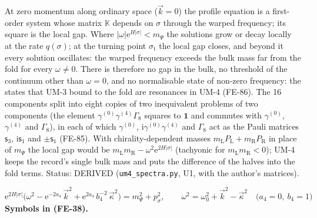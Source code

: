\documentclass[
  10pt,
]{article}
\begin{document}
At zero momentum along ordinary space (\(\vec k = 0\)) the profile
equation is a first-order system whose matrix \(\mathbb{K}\) depends on
\(\sigma\) through the warped frequency; its square is the local gap.
Where \(\lvert\omega\rvert\mathrm{e}^{H\lvert\sigma\rvert} < m_\Psi\)
the solutions grow or decay locally at the rate \(q(\sigma)\); at the
turning point \(\sigma_{\mathrm{t}}\) the local gap closes, and beyond
it every solution oscillates: the warped frequency exceeds the bulk mass
far from the fold for every \(\omega \ne 0\). There is therefore no gap
in the bulk, no threshold of the continuum other than \(\omega = 0\),
and no normalisable state of non-zero frequency: the states that UM-3
bound to the fold are resonances in UM-4 (FE-86). The 16 components
split into eight copies of two inequivalent problems of two components
(the element \(\gamma^{(0)}\gamma^{(4)}\Gamma_8\) squares to
\(\mathbf{1}\) and commutes with \(\gamma^{(0)}\), \(\gamma^{(4)}\) and
\(\Gamma_8\)), in each of which \(\gamma^{(0)}\),
\(\mathrm{i}\gamma^{(0)}\gamma^{(4)}\) and \(\Gamma_8\) act as the Pauli
matrices \(\mathsf{s}_3\), \(\mathrm{i}\mathsf{s}_1\) and
\(\pm\mathsf{s}_1\) (FE-85). With chirality-dependent masses
\(m_{\mathrm{L}}P_{\mathrm{L}} + m_{\mathrm{R}}P_{\mathrm{R}}\) in place
of \(m_\Psi\) the local gap would be
\(m_{\mathrm{L}}m_{\mathrm{R}} - \omega^2\mathrm{e}^{2H\lvert\sigma\rvert}\)
(tachyonic for \(m_{\mathrm{L}}m_{\mathrm{R}} < 0\)); UM-4 keeps the
record's single bulk mass and puts the difference of the halves into the
fold terms. Status: DERIVED (\texttt{um4\_spectra.py}, U1, with the
author's matrices).

\[
\mathrm{e}^{2H\lvert\sigma\rvert}\Big(\omega^2 - \mathrm{e}^{-2a_4}\,\vec k^2 + \mathrm{e}^{2a_4}\,b_4^{-2}\,\vec\kappa^2\Big) = m_\Psi^2 + p_\sigma^2,\qquad
\omega^2 = \omega_0^2 + \vec k^2 - \vec\kappa^2\quad\big(a_4 = 0,\ b_4 = 1\big) \tag{FE-38}
\] \textbf{Symbols in (FE-38).}
\end{document}
